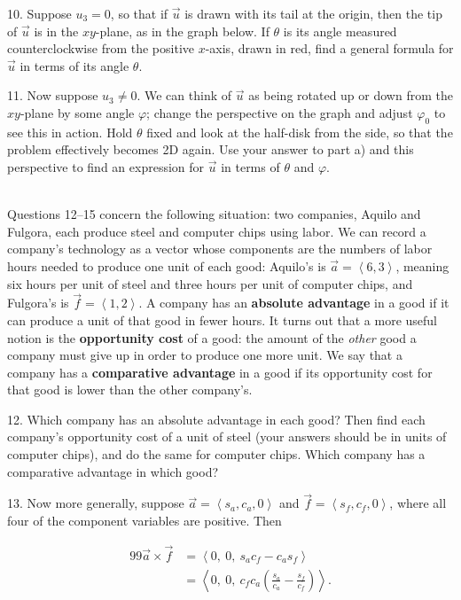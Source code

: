 \documentclass{article}
\begin{document}
10. Suppose $u_3 = 0$, so that if $\vec{u}$ is drawn with its tail at the origin, then the tip of $\vec{u}$ is in the $xy$-plane, as in the graph below. If $\theta$ is its angle measured counterclockwise from the positive $x$-axis, drawn in red, find a general formula for $\vec{u}$ in terms of its angle $\theta$.

11. Now suppose $u_3 \neq 0$. We can think of $\vec{u}$ as being rotated up or down from the $xy$-plane by some angle $\varphi$; change the perspective on the graph and adjust $\varphi_0$ to see this in action. Hold $\theta$ fixed and look at the half-disk from the side, so that the problem effectively becomes 2D again. Use your answer to part a) and this perspective to find an expression for $\vec{u}$ in terms of $\theta$ and $\varphi$.

~\\

Questions 12--15 concern the following situation: two companies, Aquilo and Fulgora, each produce steel and computer chips using labor. We can record a company's technology as a vector whose components are the numbers of labor hours needed to produce one unit of each good: Aquilo's is $\vec{a} = \left< 6, 3 \right>$, meaning six hours per unit of steel and three hours per unit of computer chips, and Fulgora's is $\vec{f} = \left< 1, 2 \right>$. A company has an \textbf{absolute advantage} in a good if it can produce a unit of that good in fewer hours. It turns out that a more useful notion is the \textbf{opportunity cost} of a good: the amount of the \textit{other} good a company must give up in order to produce one more unit. We say that a company has a \textbf{comparative advantage} in a good if its opportunity cost for that good is lower than the other company's.

12. Which company has an absolute advantage in each good? Then find each company's opportunity cost of a unit of steel (your answers should be in units of computer chips),  and do the same for computer chips. Which company has a comparative advantage in which good?

13. Now more generally, suppose $\vec{a} = \left< s_a, c_a, 0 \right>$ and $\vec{f} = \left< s_f, c_f, 0 \right>$, where all four of the component variables are positive. Then

\begin{alignat*}{99}
	\vec{a} \times \vec{f} &= \left< 0,\ 0,\ s_ac_f - c_as_f \right>\\
	&= \left< 0,\ 0,\ c_fc_a\left( \frac{s_a}{c_a} - \frac{s_f}{c_f} \right) \right>.
\end{alignat*}
\end{document}
